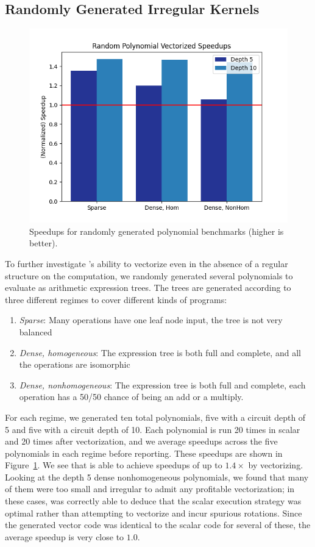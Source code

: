 \subsection{Randomly Generated Irregular Kernels}
\begin{figure}
    \includegraphics[width=0.7\linewidth]{figures/graphs/trees.png}
    \caption{Speedups for randomly generated polynomial benchmarks (higher is better).}\label{fig:polynomial-speedups}
\end{figure}

To further investigate \system's ability to vectorize even in the absence of a regular structure on the computation, we randomly generated several polynomials to evaluate as arithmetic expression trees.
The trees are generated according to three different regimes to cover different kinds of programs:
\begin{enumerate}
    \item {\em Sparse}: Many operations have one leaf node input, the tree is not very balanced
    \item {\em Dense, homogeneous}: The expression tree is both full and complete, and all the operations are isomorphic
    \item {\em Dense, nonhomogeneous}: The expression tree is both full and complete, each operation has a 50/50 chance of being an add or a multiply.
\end{enumerate}
For each regime, we generated ten total polynomials, five with a circuit depth of 5 and five with a circuit depth of 10.
Each polynomial is run 20 times in scalar and 20 times after vectorization, and we average speedups across the five polynomials in each regime before reporting.
These speedups are shown in Figure~\ref{fig:polynomial-speedups}.
We see that \system is able to achieve speedups of up to $1.4\times$ by vectorizing.
Looking at the depth 5 dense nonhomogeneous polynomials, we found that many of them were too small and irregular to admit any profitable vectorization; in these cases, \system was correctly able to deduce that the scalar execution strategy was optimal rather than attempting to vectorize and incur spurious rotations.
Since the generated vector code was identical to the scalar code for several of these, the average speedup is very close to $1.0$.

